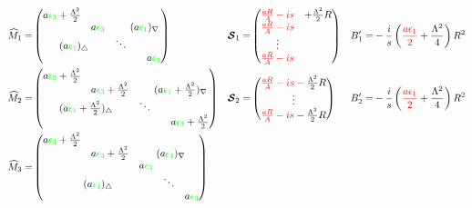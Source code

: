 \documentclass[aps,prd,onecolumn
,tightenlines,letterpaper,
notitlepage,11pt,
nofootinbib]{revtex4-1}
\begin{document}
\begin{align*}
\cM_1 =&
\begin{pmatrix}
a\green{\epsilon_3}+\frac{\Lambda^2}{2} & & & \\ 
& a\green{\epsilon_3} & &\multicolumn{2}{l}{\!\!\!\!(a\green{\epsilon_1})_\nabla} \\
 \multicolumn{2}{c}{(a\green{\epsilon_1})_\triangle} & \ddots & \\
  & & & & a\green{\epsilon_3} \\
\end{pmatrix}
&
\ve{\cS}_1 =&\begin{pmatrix}\red{\frac{aR}{A}-is}&+\frac{\Lambda^2}{2}R\\\red{\frac{aR}{A}-is}&\\\vdots&\\\red{\frac{aR}{A}-is}&\end{pmatrix}
&
B'_1=&-\frac{i}{s}\left(\red{\frac{a\epsilon_1}{2}}+\frac{\Lambda^2}{4}\right)R^2
\\
\cM_2 =&
\begin{pmatrix}
a\green{\epsilon_3}+\frac{\Lambda^2}{2} & & & \\ 
& a\green{\epsilon_3}+\frac{\Lambda^2}{2} & &\multicolumn{2}{l}{\!\!\!\!(a\green{\epsilon_1}+\frac{\Lambda^2}{2})_\nabla} \\
 \multicolumn{2}{c}{(a\green{\epsilon_1}+\frac{\Lambda^2}{2})_\triangle} & \ddots & \\
  & & & & a\green{\epsilon_3}+\frac{\Lambda^2}{2} \\
\end{pmatrix}
&
\ve{\cS}_2 =&\begin{pmatrix}\red{\frac{aR}{A}-is}-\frac{\Lambda^2}{2}R\\ \vdots\\
\red{\frac{aR}{A}-is}-\frac{\Lambda^2}{2}R\end{pmatrix}
&
B'_2=&-\frac{i}{s}\left(\red{\frac{a\epsilon_1}{2}}+\frac{\Lambda^2}{4}\right)R^2
\\
\cM_3 =&
\begin{pmatrix}
a\green{\epsilon_3}+\frac{\Lambda^2}{2} & & & &\\ 
& a\green{\epsilon_3}+\frac{\Lambda^2}{2} & &\multicolumn{2}{l}{\!\!\!\!(a\green{\epsilon_1})_\nabla} \\
&& a\green{\epsilon_3} &&\\
 \multicolumn{3}{c}{(a\green{\epsilon_1})_\triangle} & \ddots & \\
  & & & & a\green{\epsilon_3}
\end{pmatrix}

\end{align*}
\end{document}

